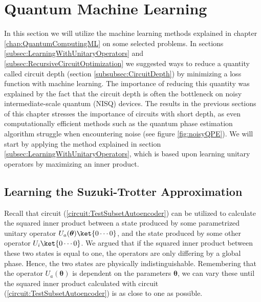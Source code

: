 \newpage

\section{Quantum Machine Learning}
\label{sec:ResDeepLearning}
In this section we will utilize the machine learning methods explained in chapter \ref{chap:QuantumComputingML} on some selected problems. In sections \ref{subsec:LearningWithUnitaryOperators} and \ref{subsec:RecursiveCircuitOptimization} we suggested ways to reduce a quantity called circuit depth (section \ref{subsubsec:CircuitDepth}) by minimizing a loss function with machine learning. The importance of reducing this quantity was explained by the fact that the circuit depth is often the bottleneck on noisy intermediate-scale quantum (NISQ) devices. The results in the previous sections of this chapter stresses the importance of circuits with short depth, as even computationally efficient methods such as the quantum phase estimation algorithm struggle when encountering noise (see figure \ref{fig:noisyQPE}). We will start by applying the method explained in section \ref{subsec:LearningWithUnitaryOperators}, which is based upon learning unitary operators by maximizing an inner product. 


\subsection{Learning the Suzuki-Trotter Approximation}
\label{subsec:LearningTheSuzukiTrotterApprox}
Recall that circuit (\ref{circuit:TestSubsetAutoencoder}) can be utilized to calculate the squared inner product between a state produced by some parametrized unitary operator $U_a(\boldsymbol{\theta})\ket{0\cdots 0}$, and the state produced by some other operator $U_i\ket{0\cdots 0}$. We argued that if the squared inner product between these two states is equal to one, the operators are only differing by a global phase. Hence, the two states are physically indistinguishable. Remembering that the operator $U_a(\boldsymbol{\theta})$ is dependent on the parameters $\boldsymbol{\theta}$, we can vary these until the squared inner product calculated with circuit (\ref{circuit:TestSubsetAutoencoder}) is as close to one as possible.

\bigskip

